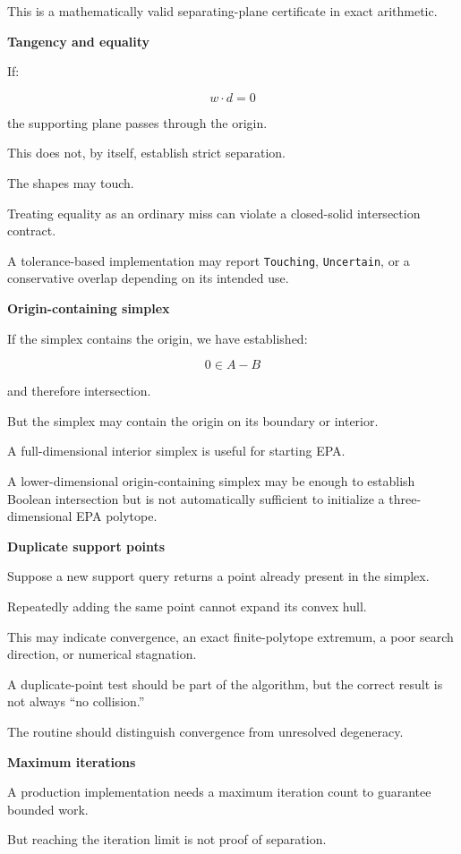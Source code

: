 This is a mathematically valid separating-plane certificate in exact arithmetic.

\textbf{Tangency and equality}

If:

\[
w\cdot d=0
\]

the supporting plane passes through the origin.

This does not, by itself, establish strict separation.

The shapes may touch.

Treating equality as an ordinary miss can violate a closed-solid intersection contract.

A tolerance-based implementation may report \texttt{Touching}, \texttt{Uncertain}, or a conservative overlap depending on its intended use.

\textbf{Origin-containing simplex}

If the simplex contains the origin, we have established:

\[
0\in A-B
\]

and therefore intersection.

But the simplex may contain the origin on its boundary or interior.

A full-dimensional interior simplex is useful for starting EPA.

A lower-dimensional origin-containing simplex may be enough to establish Boolean intersection but is not automatically sufficient to initialize a three-dimensional EPA polytope.

\textbf{Duplicate support points}

Suppose a new support query returns a point already present in the simplex.

Repeatedly adding the same point cannot expand its convex hull.

This may indicate convergence, an exact finite-polytope extremum, a poor search direction, or numerical stagnation.

A duplicate-point test should be part of the algorithm, but the correct result is not always ``no collision.''

The routine should distinguish convergence from unresolved degeneracy.

\textbf{Maximum iterations}

A production implementation needs a maximum iteration count to guarantee bounded work.

But reaching the iteration limit is not proof of separation.

